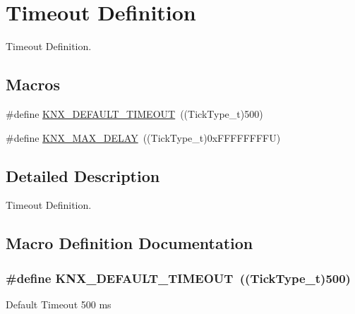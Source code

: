 \hypertarget{group___k_n_x___timeout}{}\section{Timeout Definition}
\label{group___k_n_x___timeout}


Timeout Definition.  


\subsection*{Macros}
\begin{DoxyCompactItemize}
\item 
\#define \hyperlink{group___k_n_x___timeout_ga2403c0399f3728bfe63f5d9cf631817d}{K\+N\+X\+\_\+\+D\+E\+F\+A\+U\+L\+T\+\_\+\+T\+I\+M\+E\+O\+UT}~((Tick\+Type\+\_\+t)500)
\item 
\#define \hyperlink{group___k_n_x___timeout_ga8e1f26f2f54559b80991272e3b5e13e8}{K\+N\+X\+\_\+\+M\+A\+X\+\_\+\+D\+E\+L\+AY}~((Tick\+Type\+\_\+t)0x\+F\+F\+F\+F\+F\+F\+F\+F\+U)
\end{DoxyCompactItemize}


\subsection{Detailed Description}
Timeout Definition. 



\subsection{Macro Definition Documentation}
\subsubsection[{\texorpdfstring{K\+N\+X\+\_\+\+D\+E\+F\+A\+U\+L\+T\+\_\+\+T\+I\+M\+E\+O\+UT}{KNX_DEFAULT_TIMEOUT}}]{\setlength{\rightskip}{0pt plus 5cm}\#define K\+N\+X\+\_\+\+D\+E\+F\+A\+U\+L\+T\+\_\+\+T\+I\+M\+E\+O\+UT~((Tick\+Type\+\_\+t)500)}\hypertarget{group___k_n_x___timeout_ga2403c0399f3728bfe63f5d9cf631817d}{}\label{group___k_n_x___timeout_ga2403c0399f3728bfe63f5d9cf631817d}
Default Timeout 500 ms 
